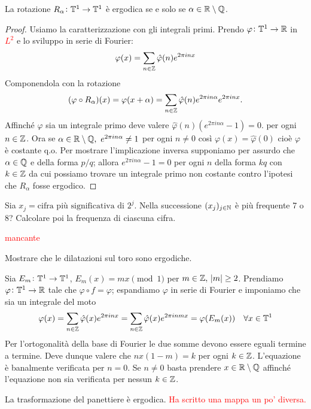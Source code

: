 \begin{proposition}
    La rotazione $ R_\alpha \colon \mathbb{T}^1 \to \mathbb{T}^1 $ è ergodica se e solo se $ \alpha \in \mathbb{R} \setminus \mathbb{Q} $. 
\end{proposition}
\begin{proof}
    Usiamo la caratterizzazione con gli integrali primi. Prendo $ \varphi \colon \mathbb{T}^1 \to \mathbb{R} $ in \textcolor{red}{$ L^2 $} e lo sviluppo in serie di Fourier:
    \[
        \varphi(x) = \sum_{n \in \mathbb{Z}} \hat{\varphi}(n) e^{2\pi i n x}
    \]
    Componendola con la rotazione
    \[
        (\varphi \circ R_\alpha)(x) = \varphi(x + \alpha) = \sum_{n \in \mathbb{Z}} \hat{\varphi}(n) e^{2\pi i n \alpha} e^{2\pi i n x}.
    \]
    Affinché $ \varphi $ sia un integrale primo deve valere $ \hat{\varphi}(n) \left(e^{2\pi i n \alpha} - 1 \right) = 0. $ per ogni $ n \in \mathbb{Z} $.
    Ora se $ \alpha \in \mathbb{R} \setminus \mathbb{Q}, \ e^{2\pi i n \alpha} \neq 1 $ per ogni $ n \neq 0 $ così $ \varphi(x) = \hat{\varphi}(0) $ cioè $ \varphi $ è costante q.o. Per mostrare l'implicazione inversa supponiamo per assurdo che $ \alpha \in \mathbb{Q} $ e della forma $ p/q $; allora $ e^{2\pi i n \alpha} - 1 = 0 $ per ogni $ n $ della forma $ kq $ con $ k \in \mathbb{Z} $ da cui possiamo trovare un integrale primo non costante contro l'ipotesi che $ R_\alpha $ fosse ergodico.
\end{proof}

\begin{exercise}
    Sia $ x_j = \text{cifra più significativa di } 2^j $. Nella successione $ (x_j)_{j\in\mathbb{N}} $ è più frequente 7 o 8? Calcolare poi la frequenza di ciascuna cifra.
\end{exercise}

\begin{example}
    \textcolor{red}{mancante}
\end{example}

\begin{exercise}
    Mostrare che le dilatazioni sul toro sono ergodiche.
\end{exercise}
\begin{solution}
    Sia $ E_m\colon\mathbb{T}^1\to\mathbb{T}^1 $, $ E_m(x) = mx\pmod{1} $ per $ m\in\mathbb{Z},\ \abs{m} \geq 2 $. Prendiamo $ \varphi\colon\mathbb{T}^1\to\mathbb{R} $ tale che $ \varphi\circ f = \varphi $; espandiamo $ \varphi $ in serie di Fourier e imponiamo che sia un integrale del moto
    \[ \varphi(x) = \sum_{n\in\mathbb{Z}} \hat\varphi(x) e^{2\pi i n x} = \sum_{n\in\mathbb{Z}} \hat\varphi(x) e^{2\pi i n m x} = \varphi(E_m(x)) \quad \forall x\in\mathbb{T}^1 \]
    Per l'ortogonalità della base di Fourier le due somme devono essere eguali termine a termine. Deve dunque valere che $ nx(1-m) = k $ per ogni $ k\in\mathbb{Z} $. L'equazione è banalmente verificata per $ n = 0 $. Se $ n\neq 0 $ basta prendere $ x\in\mathbb{R}\setminus\mathbb{Q} $ affinché l'equazione non sia verificata per nessun $ k\in\mathbb{Z} $.
\end{solution}

\begin{exercise}
    La trasformazione del panettiere è ergodica. \textcolor{red}{Ha scritto una mappa un po' diversa.}
\end{exercise}

